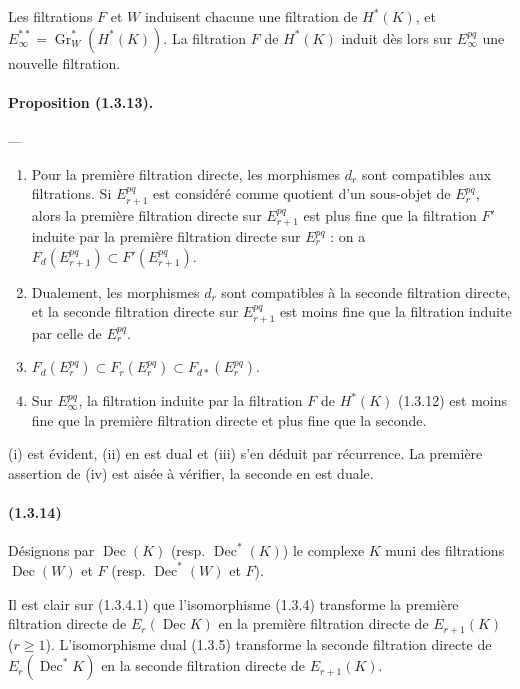 \documentclass[10pt]{article}
\newcommand{\Gr}{\operatorname{Gr}}
\newcommand{\Dec}{\operatorname{Dec}}
\begin{document}
Les filtrations $F$ et $W$ induisent chacune une filtration de $H^*(K)$, et $E_\infty^{**}=\Gr_W^*(H^*(K))$. La filtration $F$ de $H^*(K)$ induit dès lors sur $E_\infty^{pq}$ une nouvelle filtration.

\paragraph{Proposition (1.3.13).} ---
\begin{enumerate}[label=(\roman*)]
\item Pour la première filtration directe, les morphismes $d_r$ sont compatibles aux filtrations. Si $E_{r+1}^{pq}$ est considéré comme quotient d'un sous-objet de $E_r^{pq}$, alors la première filtration directe sur $E_{r+1}^{pq}$ est plus fine que la filtration $F'$ induite par la première filtration directe sur $E_r^{pq}$ : on a $F_d(E_{r+1}^{pq})\subset F'(E_{r+1}^{pq})$.
\item Dualement, les morphismes $d_r$ sont compatibles à la seconde filtration directe, et la seconde filtration directe sur $E_{r+1}^{pq}$ est moins fine que la filtration induite par celle de $E_r^{pq}$.
\item $F_d(E_r^{pq})\subset F_r(E_r^{pq})\subset F_{d*}(E_r^{pq})$.
\item Sur $E_\infty^{pq}$, la filtration induite par la filtration $F$ de $H^*(K)$ (1.3.12) est moins fine que la première filtration directe et plus fine que la seconde.
\end{enumerate}
(i) est évident, (ii) en est dual et (iii) s'en déduit par récurrence. La première assertion de (iv) est aisée à vérifier, la seconde en est duale.

\paragraph{(1.3.14)} Désignons par $\Dec(K)$ (resp. $\Dec^*(K)$) le complexe $K$ muni des filtrations $\Dec(W)$ et $F$ (resp. $\Dec^*(W)$ et $F$).

Il est clair sur (1.3.4.1) que l'isomorphisme (1.3.4) transforme la première filtration directe de $E_r(\Dec K)$ en la première filtration directe de $E_{r+1}(K)$ ($r\ge1$). L'isomorphisme dual (1.3.5) transforme la seconde filtration directe de $E_r(\Dec^*K)$ en la seconde filtration directe de $E_{r+1}(K)$.
\end{document}
